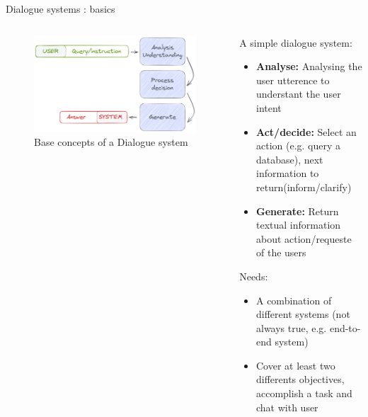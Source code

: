 \documentclass[10pt,aspectratio=169]{beamer}
\begin{document}
\begin{frame}{Dialogue systems : basics}
    \begin{columns}
        \begin{column}{0.5\textwidth}
            \begin{figure}
                \centering
                \includegraphics[width=1.\textwidth]{media/base_process_dial.png}
                \caption{Base concepts of a Dialogue system }
                \label{fig:base-process}
            \end{figure}
        \end{column}
        \begin{column}{0.5\textwidth}
            \begin{block}{A simple dialogue system: }
                \begin{itemize}
                    \item \textbf{Analyse:} Analysing the user utterence to understant the user intent
                    \item \textbf{Act/decide:} Select an action (e.g. query a database), next information to return(inform/clarify)
                    \item \textbf{Generate:} Return textual information about action/requeste of the users
                \end{itemize}

                \begin{block}{Needs: }
                    \begin{itemize}
                        \item A combination of different systems (not always true, e.g. end-to-end system)
                        \item Cover at least two differents objectives,  accomplish a task and chat with user
                    \end{itemize}
                \end{block}
            \end{block}
        \end{column}
    \end{columns}
\end{frame}
\end{document}
